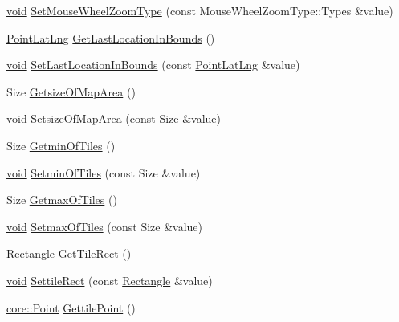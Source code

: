 \begin{DoxyCompactItemize}
\item 
\hyperlink{group___u_a_v_objects_plugin_ga444cf2ff3f0ecbe028adce838d373f5c}{void} \hyperlink{group___o_p_map_widget_ga605f19f8d878c649a0c0fe7aefde25c7}{\-Set\-Mouse\-Wheel\-Zoom\-Type} (const \-Mouse\-Wheel\-Zoom\-Type\-::\-Types \&value)
\item 
\hyperlink{structinternals_1_1_point_lat_lng}{\-Point\-Lat\-Lng} \hyperlink{group___o_p_map_widget_ga9869340265138d874099cdffed04d95a}{\-Get\-Last\-Location\-In\-Bounds} ()
\item 
\hyperlink{group___u_a_v_objects_plugin_ga444cf2ff3f0ecbe028adce838d373f5c}{void} \hyperlink{group___o_p_map_widget_ga49e6ed17c97e596b9fb3103b63816212}{\-Set\-Last\-Location\-In\-Bounds} (const \hyperlink{structinternals_1_1_point_lat_lng}{\-Point\-Lat\-Lng} \&value)
\item 
\-Size \hyperlink{group___o_p_map_widget_gafbcd83a2c5548f22c6cbb52a09ff402d}{\-Getsize\-Of\-Map\-Area} ()
\item 
\hyperlink{group___u_a_v_objects_plugin_ga444cf2ff3f0ecbe028adce838d373f5c}{void} \hyperlink{group___o_p_map_widget_ga2e491fd5e0849b99f2d9d180c71cb68d}{\-Setsize\-Of\-Map\-Area} (const \-Size \&value)
\item 
\-Size \hyperlink{group___o_p_map_widget_gaa4181b7edf2df8de57265234f1068b67}{\-Getmin\-Of\-Tiles} ()
\item 
\hyperlink{group___u_a_v_objects_plugin_ga444cf2ff3f0ecbe028adce838d373f5c}{void} \hyperlink{group___o_p_map_widget_gaf34f47548612f5dcf275002aa9b3466c}{\-Setmin\-Of\-Tiles} (const \-Size \&value)
\item 
\-Size \hyperlink{group___o_p_map_widget_gaa2cd678b4016f6334bfef3c1c8ac3b03}{\-Getmax\-Of\-Tiles} ()
\item 
\hyperlink{group___u_a_v_objects_plugin_ga444cf2ff3f0ecbe028adce838d373f5c}{void} \hyperlink{group___o_p_map_widget_gab059331f4276245f3415728687b72659}{\-Setmax\-Of\-Tiles} (const \-Size \&value)
\item 
\hyperlink{structinternals_1_1_rectangle}{\-Rectangle} \hyperlink{group___o_p_map_widget_gaff36128b86944502f81b27d0d9ca418b}{\-Get\-Tile\-Rect} ()
\item 
\hyperlink{group___u_a_v_objects_plugin_ga444cf2ff3f0ecbe028adce838d373f5c}{void} \hyperlink{group___o_p_map_widget_ga6305b3465177838582206b9911561cf9}{\-Settile\-Rect} (const \hyperlink{structinternals_1_1_rectangle}{\-Rectangle} \&value)
\item 
\hyperlink{structcore_1_1_point}{core\-::\-Point} \hyperlink{group___o_p_map_widget_ga917de66816feaf3dfde7727bbb8ed6e2}{\-Gettile\-Point} ()

\end{DoxyCompactItemize}
